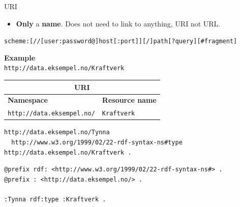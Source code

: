 \documentclass{dt}
\begin{document}
\begin{frame}{URI}
\begin{itemize}
\item
\textbf{Only} a \textbf{name}. Does not need to link to anything, URI not URL.
\end{itemize}

\begin{center}
\small{\texttt{scheme:[//[user:password@]host[:port]][/]path[?query][\#fragment]}}
\end{center}

\vspace{10pt}

\textbf{Example}\\
\texttt{http://data.eksempel.no/Kraftverk}

\vspace{10pt}

\begin{tabular}{|l|l|}
\hline
\multicolumn{2}{|c|}{\textbf{URI}}\\
\hline
\textbf{Namespace}&\textbf{Resource name}\\
\hline
\texttt{http://data.eksempel.no/}&\texttt{Kraftverk}\\
\hline
\end{tabular}
\end{frame}

\begin{frame}[fragile]
\begin{code}
\begin{verbatim}
http://data.eksempel.no/Tynna 
  http://www.w3.org/1999/02/22-rdf-syntax-ns#type http://data.eksempel.no/Kraftverk .
\end{verbatim}
\end{code}
\end{frame}

\begin{frame}[fragile]
\begin{code}
\begin{verbatim}
@prefix rdf: <http://www.w3.org/1999/02/22-rdf-syntax-ns#> .
@prefix : <http://data.eksempel.no/> .

:Tynna rdf:type :Kraftverk .
\end{verbatim}
\end{code}
\end{frame}
\end{document}
